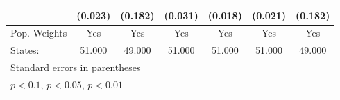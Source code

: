{\begin{tabular}{l*{6}{c}}
            &     (0.023)         &     (0.182)         &     (0.031)         &     (0.018)         &     (0.021)         &     (0.182)         \\
\hline
Pop.-Weights&         Yes         &         Yes         &         Yes         &         Yes         &         Yes         &         Yes         \\
States:     &      51.000         &      49.000         &      51.000         &      51.000         &      51.000         &      49.000         \\
\hline\hline
\multicolumn{7}{l}{\footnotesize Standard errors in parentheses}\\
\multicolumn{7}{l}{\footnotesize \sym{*} \(p<0.1\), \sym{**} \(p<0.05\), \sym{***} \(p<0.01\)}\\
\end{tabular}
}
